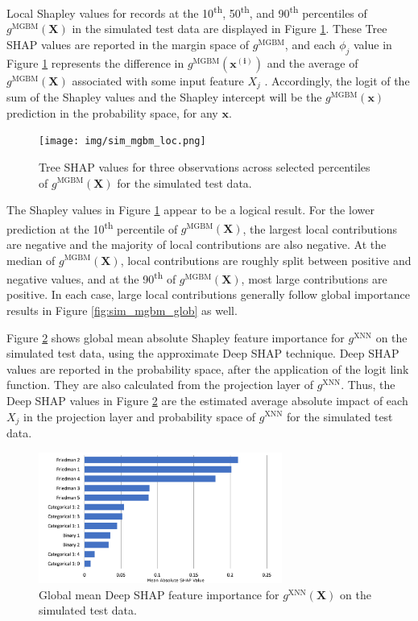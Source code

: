 \documentclass[information,article,submit,moreauthors,pdftex]{definitions/mdpi}
\begin{document}
Local Shapley values for records at the 10\textsuperscript{th}, 50\textsuperscript{th}, and 90\textsuperscript{th} percentiles of $g^\text{MGBM}(\mathbf{X})$ in the simulated test data are displayed in Figure \ref{fig:sim_mgbm_loc}. These Tree SHAP values are reported in the margin space of $g^\text{MGBM}$, and each $\phi_j$ value in Figure \ref{fig:sim_mgbm_loc} represents the difference in $g^\text{MGBM}(\mathbf{x^{(i)}})$ and the average of $g^\text{MGBM}(\mathbf{X})$ associated with some input feature $X_j$ \cite{molnar}. Accordingly, the logit of the sum of the Shapley values and the Shapley intercept will be the $g^\text{MGBM}(\mathbf{x})$ prediction in the probability space, for any $\mathbf{x}$. 

\begin{figure}[H]
	\centering
	\texttt{[image: img/sim\_mgbm\_loc.png]}
	\caption{Tree SHAP values for three observations across selected percentiles of $g^\text{MGBM}(\mathbf{X})$ for the simulated test data.}
	\label{fig:sim_mgbm_loc}
\end{figure}   

\noindent The Shapley values in Figure \ref{fig:sim_mgbm_loc} appear to be a logical result. For the lower prediction at the 10\textsuperscript{th} percentile of $g^\text{MGBM}(\mathbf{X})$, the largest local contributions are negative and the majority of local contributions are also negative. At the median of $g^\text{MGBM}(\mathbf{X})$, local contributions are roughly split between positive and negative values, and at the 90\textsuperscript{th} of $g^\text{MGBM}(\mathbf{X})$, most large contributions are positive. In each case, large local contributions generally follow global importance results in Figure \ref{fig:sim_mgbm_glob} as well.

Figure \ref{fig:sim_xnn_glob} shows global mean absolute Shapley feature importance for $g^\text{XNN}$ on the simulated test data, using the approximate Deep SHAP technique. Deep SHAP values are reported in the probability space, after the application of the logit link function. They are also calculated from the projection layer of $g^\text{XNN}$. Thus, the Deep SHAP values in Figure \ref{fig:sim_xnn_glob} are the estimated average absolute impact of each $X_j$ in the projection layer and probability space of $g^\text{XNN}$ for the simulated test data. 

\begin{figure}[H]
	\centering
	\includegraphics[width=8cm]{img/sim_xnn_glob.png}
	\caption{Global mean Deep SHAP feature importance for $g^\text{XNN}(\mathbf{X})$ on the simulated test data.}
	\label{fig:sim_xnn_glob}
\end{figure} 
\end{document}
